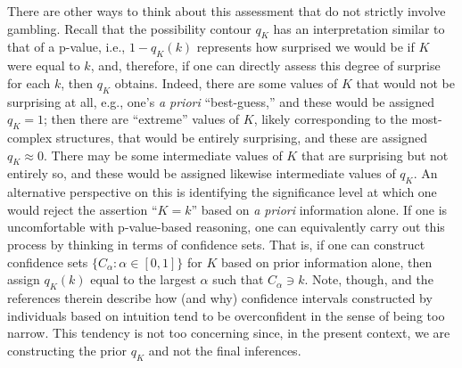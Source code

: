 \documentclass[12pt]{article}
\begin{document}
There are other ways to think about this assessment that do not strictly involve gambling.  Recall that the possibility contour $q_K$ has an interpretation similar to that of a p-value, i.e., $1-q_K(k)$ represents how surprised \citep[e.g.,][]{shackle1961decision} we would be if $K$ were equal to $k$, and, therefore, if one can directly assess this degree of surprise for each $k$, then $q_K$ obtains.  Indeed, there are some values of $K$ that would not be surprising at all, e.g., one's {\em a priori} ``best-guess,'' and these would be assigned $q_K = 1$; then there are ``extreme'' values of $K$, likely corresponding to the most-complex structures, that would be entirely surprising, and these are assigned $q_K \approx 0$.  There may be some intermediate values of $K$ that are surprising but not entirely so, and these would be assigned likewise intermediate values of $q_K$.  An alternative perspective on this is identifying the significance level at which one would reject the assertion ``$K=k$'' based on {\em a priori} information alone.  If one is uncomfortable with p-value-based reasoning, one can equivalently carry out this process by thinking in terms of confidence sets.  That is, if one can construct confidence sets $\{C_\alpha: \alpha \in [0,1]\}$ for $K$ based on prior information alone, then assign $q_K(k)$ equal to the largest $\alpha$ such that $C_\alpha \ni k$.  Note, though, \citet{juslin.etal.2007} and the references therein describe how (and why) confidence intervals constructed by individuals based on intuition tend to be overconfident in the sense of being too narrow.  This tendency is not too concerning since, in the present context, we are constructing the prior $q_K$ and not the final inferences.  
\end{document}
